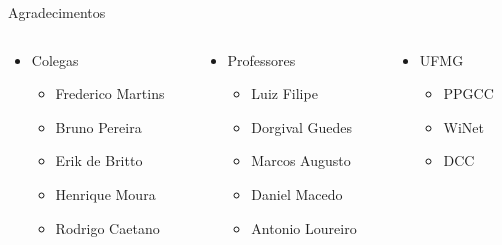 \begin{frame}{Agradecimentos}

    \begin{columns}[T] %
        \begin{column}{.33\textwidth}
            \begin{itemize}
                \item Colegas
                    \begin{itemize}
                        \item Frederico Martins
                        \item Bruno Pereira
                        \item Erik de Britto
                        \item Henrique Moura
                        \item Rodrigo Caetano
                    \end{itemize}
            \end{itemize}
        \end{column}%
        \hfill%
        \begin{column}{.33\textwidth}
            \begin{itemize}
                \item Professores
                    \begin{itemize}
                        \item Luiz Filipe
                        \item Dorgival Guedes
                        \item Marcos Augusto
                        \item Daniel Macedo
                        \item Antonio Loureiro
                    \end{itemize}
            \end{itemize}
        \end{column}%
        \hfill%
        \begin{column}{.33\textwidth}
            \begin{itemize}
                \item UFMG
                    \begin{itemize}
                        \item PPGCC
                        \item WiNet
                        \item DCC
                    \end{itemize}
            \end{itemize}
        \end{column}%
    \end{columns}
\end{frame}

